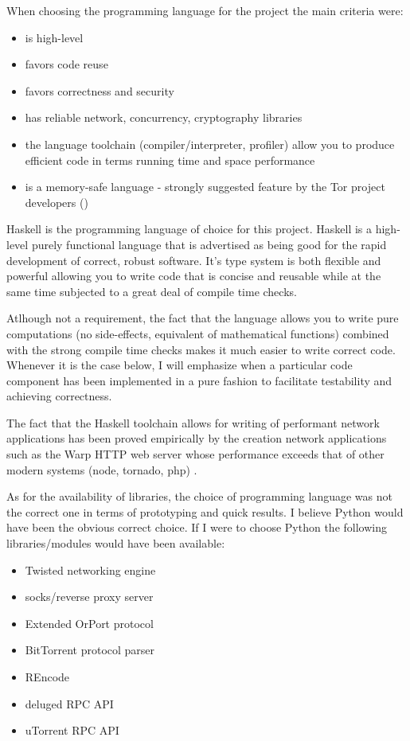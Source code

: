 \documentclass[11pt]{article} %
\begin{document}
When choosing the programming language for the project the main criteria were:

\begin{itemize}
\item is high-level
\item favors code reuse
\item favors correctness and security
\item has reliable network, concurrency, cryptography libraries
\item the language toolchain (compiler/interpreter, profiler) allow you to produce efficient code in terms running time and space performance
\item is a memory-safe language - strongly suggested feature by the Tor project developers (\citep*{web:torPluggableTransports})
\end{itemize}

Haskell is the programming language of choice for this project. Haskell is a high-level purely functional language that is advertised as being good for the rapid development of correct, robust software. It's type system is both flexible and powerful allowing you to write code that is concise and reusable while at the same time subjected to a great deal of compile time checks.

Atlhough not a requirement, the fact that the language allows you to write pure computations (no side-effects, equivalent of mathematical functions) combined with the strong compile time checks makes it much  easier to write correct code. Whenever it is the case below, I will emphasize when a particular code component has been implemented in a pure fashion to facilitate testability and achieving correctness.

The fact that the Haskell toolchain allows for writing of performant network applications has been proved empirically by the creation network applications such as the Warp HTTP web server whose performance exceeds that of other modern systems (node, tornado, php) \citep*{web:warpCrossBenchmark}.

As for the availability of libraries, the choice of programming language was not the correct one in terms of prototyping and quick results. I believe Python would have been the obvious correct choice. If I were to choose Python the following libraries/modules would have been available:

\begin{itemize}
\item Twisted networking engine 
\item socks/reverse proxy server
\item Extended OrPort protocol  
\item BitTorrent protocol parser
\item REncode
\item deluged RPC API 
\item uTorrent RPC API
\end{itemize}
\end{document}
